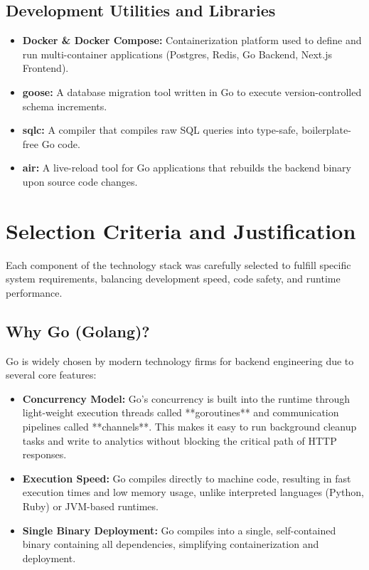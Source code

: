 \subsection{Development Utilities and Libraries}
\begin{itemize}
    \item \textbf{Docker \& Docker Compose:} Containerization platform used to define and run multi-container applications (Postgres, Redis, Go Backend, Next.js Frontend).
    \item \textbf{goose:} A database migration tool written in Go to execute version-controlled schema increments.
    \item \textbf{sqlc:} A compiler that compiles raw SQL queries into type-safe, boilerplate-free Go code.
    \item \textbf{air:} A live-reload tool for Go applications that rebuilds the backend binary upon source code changes.
\end{itemize}

\section{Selection Criteria and Justification}
Each component of the technology stack was carefully selected to fulfill specific system requirements, balancing development speed, code safety, and runtime performance.

\subsection{Why Go (Golang)?}
Go is widely chosen by modern technology firms for backend engineering due to several core features:
\begin{itemize}
    \item \textbf{Concurrency Model:} Go's concurrency is built into the runtime through light-weight execution threads called **goroutines** and communication pipelines called **channels**. This makes it easy to run background cleanup tasks and write to analytics without blocking the critical path of HTTP responses.
    \item \textbf{Execution Speed:} Go compiles directly to machine code, resulting in fast execution times and low memory usage, unlike interpreted languages (Python, Ruby) or JVM-based runtimes.
    \item \textbf{Single Binary Deployment:} Go compiles into a single, self-contained binary containing all dependencies, simplifying containerization and deployment.
\end{itemize}

